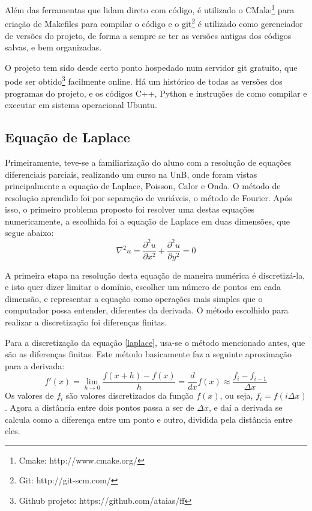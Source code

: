 \documentclass[journal]{IEEEtran}
\begin{document}
Além das ferramentas que lidam direto com código, é utilizado o CMake\footnote{Cmake: http://www.cmake.org/} para criação de Makefiles para compilar o código e o git\footnote{Git: http://git-scm.com/} é utilizado como gerenciador de versões do projeto, de forma a sempre se ter as versões antigas dos códigos salvas, e bem organizadas.

O projeto tem sido desde certo ponto hospedado num servidor git gratuito, que pode ser obtido\footnote{Github projeto: https://github.com/ataias/ff} facilmente online. Há um histórico de todas as versões dos programas do projeto, e os códigos C++, Python e instruções de como compilar e executar em sistema operacional Ubuntu.
\subsection{Equação de Laplace}
Primeiramente, teve-se a familiarização do aluno com a resolução de equações diferenciais parciais, realizando um curso na UnB, onde foram vistas principalmente a equação de Laplace, Poisson, Calor e Onda. O método de resolução aprendido foi por separação de variáveis, o método de Fourier. Após isso, o primeiro problema proposto foi resolver uma destas equações numericamente, a escolhida foi a equação de Laplace em duas dimensões, que segue abaixo:
\begin{equation}
\nabla^2 u=\frac{\partial^2 u}{\partial x^2}+\frac{\partial^2 u}{\partial y^2}=0\label{laplace}
\end{equation}

A primeira etapa na resolução desta equação de maneira numérica é discretizá-la, e isto quer dizer limitar o domínio, escolher um número de pontos em cada dimensão, e representar a equação como operações mais simples que o computador possa entender, diferentes da derivada. O método escolhido para realizar a discretização foi diferenças finitas.

Para a discretização da equação \ref{laplace}, usa-se o método mencionado antes, que são as diferenças finitas. Este método basicamente faz a seguinte aproximação para a derivada:
\begin{equation}
f'(x)=\lim_{h\rightarrow 0}\frac{f(x+h)-f(x)}{h}=\frac{d}{dx}f(x)\approx \frac{f_i-f_{i-1}}{\Delta x}
\end{equation}
Os valores de $f_i$ são valores discretizados da função $f(x)$, ou seja, $f_i=f(i\Delta x)$. Agora a distância entre dois pontos passa a ser de $\Delta x$, e daí a derivada se calcula como a diferença entre um ponto e outro, dividida pela distância entre eles. 
\end{document}
